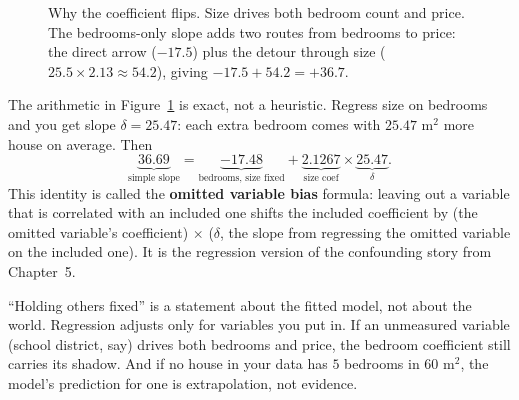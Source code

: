 \begin{figure}[H]
\centering
{}
\caption{Why the coefficient flips. Size drives both bedroom count and price. The
bedrooms-only slope adds two routes from bedrooms to price: the direct arrow
($-17.5$) plus the detour through size ($25.5 \times 2.13 \approx 54.2$), giving
$-17.5 + 54.2 = +36.7$.}
\label{fig:mlr-dag}
\end{figure}

The arithmetic in Figure~\ref{fig:mlr-dag} is exact, not a heuristic. Regress size on
bedrooms and you get slope $\delta = 25.47$: each extra bedroom comes with $25.47$ m$^2$
more house on average. Then
\[
  \underbrace{36.69}_{\text{simple slope}}
  = \underbrace{-17.48}_{\text{bedrooms, size fixed}}
  + \underbrace{2.1267}_{\text{size coef}}\times\underbrace{25.47}_{\delta}.
\]
This identity is called the \textbf{omitted variable bias} formula: leaving out a
variable that is correlated with an included one shifts the included coefficient by
(the omitted variable's coefficient) $\times$ ($\delta$, the slope from regressing the
omitted variable on the included one).
It is the regression version of the confounding story from Chapter~5.

\begin{trapbox}
``Holding others fixed'' is a statement about the fitted model, not about the world.
Regression adjusts only for variables you put in. If an unmeasured variable (school
district, say) drives both bedrooms and price, the bedroom coefficient still carries its
shadow. And if no house in your data has $5$ bedrooms in $60$ m$^2$, the model's
prediction for one is extrapolation, not evidence.
\end{trapbox}

